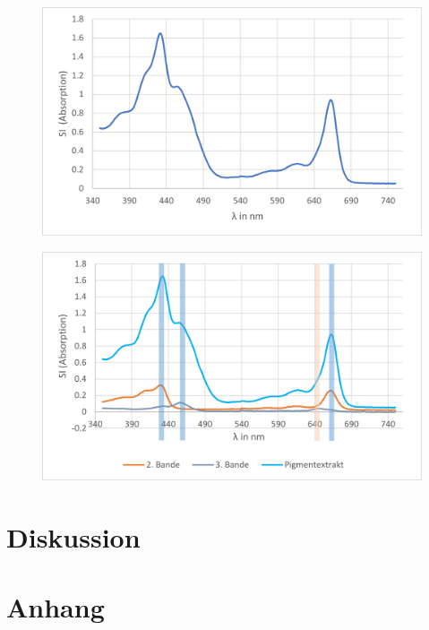 \documentclass[10pt,a4paper]{article}
\begin{document}
			\begin{figure}[H]
				\centering
				\includegraphics[scale=1]{fifthband.png}
				\caption{}
				\label{fig:fünfte Bande}
			\end{figure}
			
			\begin{figure}[H]
				\centering
				\includegraphics[scale=0.5]{combinedwithcommonpeaks_Pigmentextrakt.png}
				\caption{}
				\label{fig:kombinierteabsorptionsspektrum}
			\end{figure}
			
			
				
	\section{Diskussion}
	
	
	
	
	
	\section{Anhang}
\end{document}

